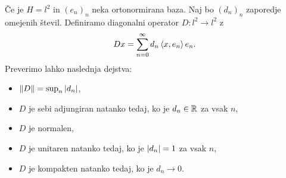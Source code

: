 
\begin{primer}
  Če je $H = l^2$ in $(e_n)_n$ neka ortonormirana baza.
  Naj bo $(d_n)_n$ zaporedje omejenih števil.
  Definiramo diagonalni operator $D: l^2 \to l^2$ z
  \[
	Dx = \sum_{n=0}^\infty d_n \left< x, e_n \right> e_n.
  \]
  Preverimo lahko naslednja dejstva:
  \begin{itemize}
  \item $\left\lVert D\right\rVert = \sup_n \left| d_n \right|$,
  \item $D$ je sebi adjungiran natanko tedaj, ko je $d_n \in \mathbb{R}$ za vsak $n$,
  \item $D$ je normalen,
  \item $D$ je unitaren natanko tedaj, ko je $\left| d_n \right| = 1$ za vsak $n$,
  \item $D$ je kompakten natanko tedaj, ko je $d_n \to 0$.
  \end{itemize}
\end{primer}

